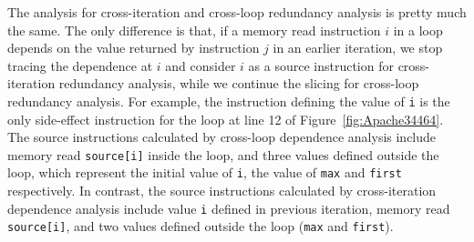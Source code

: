 

The analysis for cross-iteration and cross-loop redundancy analysis is pretty
much the same. The only difference is that, if a memory read instruction 
$i$ in a loop depends on the value returned by instruction $j$ in an earlier
iteration, we stop tracing the dependence at $i$ and consider $i$ as a
source instruction for cross-iteration redundancy analysis, while we continue
the slicing for cross-loop redundancy analysis. 
For example, 
the instruction defining the value of \texttt{i} is the only side-effect instruction 
for the loop at line 12 of Figure~\ref{fig:Apache34464}. 
The source instructions calculated by cross-loop dependence analysis include 
memory read \texttt{source[i]} inside the loop, 
and three values defined outside the loop, 
which represent the initial value of \texttt{i}, the value of \texttt{max} and \texttt{first} respectively. 
In contrast, 
the source instructions calculated by cross-iteration dependence analysis 
include value \texttt{i} defined in previous iteration, 
memory read \texttt{source[i]}, 
and two values defined outside the loop (\texttt{max} and \texttt{first}).  


